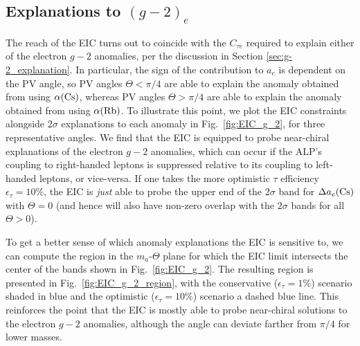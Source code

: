 \subsection{Explanations to $(g-2)_e$}\label{sec:EIC_ALP_g_2}

The reach of the EIC turns out to coincide with the $C_{\tau e}$ required to explain either of the electron $g-2$ anomalies, per the discussion in Section \ref{sec:g-2_explanation}. In particular, the sign of the contribution to $a_e$ is dependent on the PV angle, so PV angles $\Theta < \pi/4$ are able to explain the anomaly obtained from using $\alpha({\rm Cs})$, whereas PV angles $\Theta > \pi/4$ are able to explain the anomaly obtained from using $\alpha({\rm Rb})$. To illustrate this point, we plot the EIC constraints alongside $2\sigma$ explanations to each anomaly in Fig.~\ref{fig:EIC_g_2}, for three representative angles. We find that the EIC is equipped to probe near-chiral explanations of the electron $g-2$ anomalies, which can occur if the ALP's coupling to right-handed leptons is suppressed relative to its coupling to left-handed leptons, or vice-versa. If one takes the more optimistic $\tau$ efficiency $\epsilon_\tau = 10\%$, the EIC is {\it just} able to probe the upper end of the $2\sigma$ band for $\Delta a_e{(\rm Cs)}$ with $\Theta = 0$ (and hence will also have non-zero overlap with the $2\sigma$ bands for all $\Theta > 0$).


To get a better sense of which anomaly explanations the EIC is sensitive to, we can compute the region in the $m_a$-$\Theta$ plane for which the EIC limit intersects the center of the bands shown in Fig.~\ref{fig:EIC_g_2}. The resulting region is presented in Fig.~\ref{fig:EIC_g_2_region}, with the conservative ($\epsilon_\tau = 1\%$) scenario shaded in blue and the optimistic ($\epsilon_\tau = 10\%$) scenario a dashed blue line. This reinforces the point that the EIC is mostly able to probe near-chiral solutions to the electron $g-2$ anomalies, although the angle can deviate farther from $\pi/4$ for lower masses.


